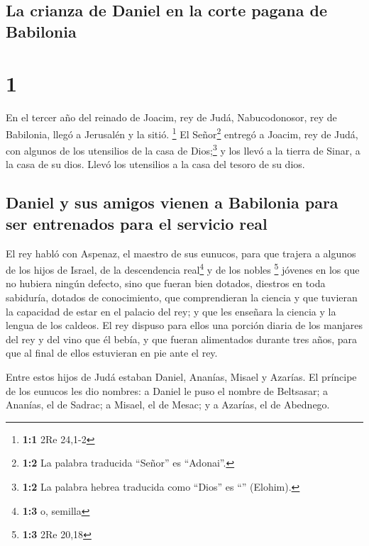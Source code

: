 \hypertarget{la-crianza-de-daniel-en-la-corte-pagana-de-babilonia}{%
\subsection{La crianza de Daniel en la corte pagana de
Babilonia}\label{la-crianza-de-daniel-en-la-corte-pagana-de-babilonia}}

\hypertarget{section}{%
\section{1}\label{section}}

 En el tercer año del reinado de Joacim, rey de Judá,
Nabucodonosor, rey de Babilonia, llegó a Jerusalén y la sitió.
\footnote{\textbf{1:1} 2Re 24,1-2}  El Señor\footnote{\textbf{1:2}
  La palabra traducida ``Señor'' es ``Adonai''.} entregó a Joacim, rey
de Judá, con algunos de los utensilios de la casa de Dios;\footnote{\textbf{1:2}
  La palabra hebrea traducida como ``Dios'' es ``''
  (Elohim).} y los llevó a la tierra de Sinar, a la casa de su dios.
Llevó los utensilios a la casa del tesoro de su dios.

\hypertarget{daniel-y-sus-amigos-vienen-a-babilonia-para-ser-entrenados-para-el-servicio-real}{%
\subsection{Daniel y sus amigos vienen a Babilonia para ser entrenados
para el servicio
real}\label{daniel-y-sus-amigos-vienen-a-babilonia-para-ser-entrenados-para-el-servicio-real}}

 El rey habló con Aspenaz, el maestro de sus eunucos, para
que trajera a algunos de los hijos de Israel, de la descendencia
real\footnote{\textbf{1:3} o, semilla} y de los nobles \footnote{\textbf{1:3}
  2Re 20,18}  jóvenes en los que no hubiera ningún
defecto, sino que fueran bien dotados, diestros en toda sabiduría,
dotados de conocimiento, que comprendieran la ciencia y que tuvieran la
capacidad de estar en el palacio del rey; y que les enseñara la ciencia
y la lengua de los caldeos.  El rey dispuso para ellos una
porción diaria de los manjares del rey y del vino que él bebía, y que
fueran alimentados durante tres años, para que al final de ellos
estuvieran en pie ante el rey.

 Entre estos hijos de Judá estaban Daniel, Ananías, Misael
y Azarías.  El príncipe de los eunucos les dio nombres: a
Daniel le puso el nombre de Beltsasar; a Ananías, el de Sadrac; a
Misael, el de Mesac; y a Azarías, el de Abednego.

